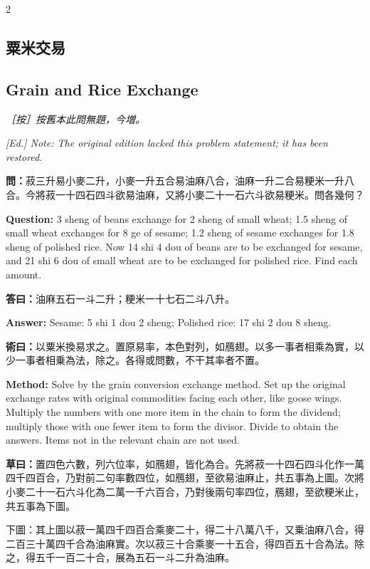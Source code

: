 \documentclass[11pt,a4paper]{article}
\newcommand{\QuestionText}[1]{\par\noindent\textbf{\color{problemcolor}問：}#1\par}
\newcommand{\AnswerText}[1]{\par\noindent\textbf{\color{answercolor}答曰：}#1\par}
\newcommand{\MethodText}[1]{\par\noindent\textbf{\color{methodcolor}術曰：}#1\par}
\newcommand{\WorkingText}[1]{\par\noindent\textbf{草曰：}#1\par}
\newcommand{\EdNoteText}[1]{\par\noindent\textit{\color{ednotecolor}［按］#1}\par}
\newcommand{\QuestionEn}[1]{\par\noindent\textbf{\color{problemcolor}Question:} #1\par}
\newcommand{\AnswerEn}[1]{\par\noindent\textbf{\color{answercolor}Answer:} #1\par}
\newcommand{\MethodEn}[1]{\par\noindent\textbf{\color{methodcolor}Method:} #1\par}
\newcommand{\EdNoteEn}[1]{\par\noindent\textit{\color{ednotecolor}[Ed.] #1}\par}
\begin{document}
\begin{paracol}{2}

\subsection*{\color{sectioncolor}粟米交易}
\switchcolumn
\subsection*{\color{sectioncolor}Grain and Rice Exchange}
\switchcolumn*

\EdNoteText{按舊本此問無題，今増。}
\switchcolumn
\EdNoteEn{Note: The original edition lacked this problem statement; it has been restored.}
\switchcolumn*

\QuestionText{菽三升易小麥二升，小麥一升五合易油麻八合，油麻一升二合易粳米一升八合。今將菽一十四石四斗欲易油麻，又將小麥二十一石六斗欲易粳米。問各幾何？}
\switchcolumn
\QuestionEn{3 sheng of beans exchange for 2 sheng of small wheat; 1.5 sheng of small wheat exchanges for 8 ge of sesame; 1.2 sheng of sesame exchanges for 1.8 sheng of polished rice. Now 14 shi 4 dou of beans are to be exchanged for sesame, and 21 shi 6 dou of small wheat are to be exchanged for polished rice. Find each amount.}
\switchcolumn*

\AnswerText{油麻五石一斗二升；粳米一十七石二斗八升。}
\switchcolumn
\AnswerEn{Sesame: 5 shi 1 dou 2 sheng; Polished rice: 17 shi 2 dou 8 sheng.}
\switchcolumn*

\MethodText{以粟米換易求之。置原易率，本色對列，如鴈翅。以多一事者相乘為實，以少一事者相乗為法，除之。各得或問數，不干其率者不置。}
\switchcolumn
\MethodEn{Solve by the grain conversion exchange method. Set up the original exchange rates with original commodities facing each other, like goose wings. Multiply the numbers with one more item in the chain to form the dividend; multiply those with one fewer item to form the divisor. Divide to obtain the answers. Items not in the relevant chain are not used.}
\switchcolumn*

\WorkingText{置四色六數，列六位率，如鴈翅，皆化為合。先將菽一十四石四斗化作一萬四千四百合，乃對前二句率數四位，如鴈翅，至欲易油麻止，共五事為上圖。次將小麥二十一石六斗化為二萬一千六百合，乃對後兩句率四位，鴈翅，至欲粳米止，共五事為下圖。

下圖：其上圖以菽一萬四千四百合乘麥二十，得二十八萬八千，又乗油麻八合，得二百三十萬四千合為油麻實。次以菽三十合乘麥一十五合，得四百五十合為法。除之，得五千一百二十合，展為五石一斗二升為油麻。

}
\end{paracol}
\end{document}
